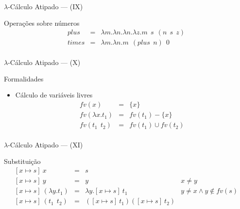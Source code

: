 \documentclass{beamer}
\begin{document}
   \begin{frame}{$\lambda$-Cálculo Atipado --- (IX)}
      \begin{block}{Operações sobre números}
         \[
             \begin{array}{lcl}
                plus & = & \lambda m.\lambda n.\lambda n.\lambda z. m\:\:s\:\:(n\:\:s\:\:z)\\
                times & = & \lambda m.\lambda n. m\:\:(plus\:\:n)\:\:0\\
             \end{array}
         \]
      \end{block}
   \end{frame}
   \begin{frame}{$\lambda$-Cálculo Atipado --- (X)}
      \begin{block}{Formalidades}
         \begin{itemize}
            \item Cálculo de variáveis livres
            \[
                \begin{array}{lcl}
                   fv(x) & = & \{x\}\\
                   fv(\lambda x.t_1) & = & fv(t_1) - \{x\}\\
                   fv(t_1\:\:t_2) & = & fv(t_1) \cup fv(t_2)\\
                \end{array}
            \]
         \end{itemize}
      \end{block}
   \end{frame}
   \begin{frame}{$\lambda$-Cálculo Atipado --- (XI)}
      \begin{block}{Substituição}
           \[
               \begin{array}{lcll}
                  {[x \mapsto s]}\:x               & = & s                              & \\
                  {[x \mapsto s]}\:y               & = & y                              & x \neq y\\
                  {[x \mapsto s]}\:(\lambda y.t_1) & = & \lambda y. {[x \mapsto s]}\: t_1 & y \neq x \land y \not\in fv(s)\\
                  {[x \mapsto s]}\:(t_1\:\:t_2)    & = & ({[x\mapsto s]}\:t_1)({[x\mapsto s]}\:t_2)\\
               \end{array}
           \]
      \end{block}
   \end{frame}
\end{document}
